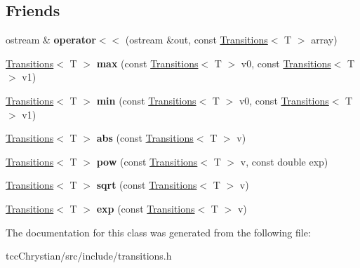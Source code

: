 \subsection*{Friends}
\begin{DoxyCompactItemize}
\item 
\hypertarget{classTransitions_a1f38245bca1673c266b44e9e2107c13d}{ostream \& {\bfseries operator$<$$<$} (ostream \&out, const \hyperlink{classTransitions}{Transitions}$<$ T $>$ array)}\label{classTransitions_a1f38245bca1673c266b44e9e2107c13d}

\item 
\hypertarget{classTransitions_af72b4da733791d7d350ed72162d8ea0f}{\hyperlink{classTransitions}{Transitions}$<$ T $>$ {\bfseries max} (const \hyperlink{classTransitions}{Transitions}$<$ T $>$ v0, const \hyperlink{classTransitions}{Transitions}$<$ T $>$ v1)}\label{classTransitions_af72b4da733791d7d350ed72162d8ea0f}

\item 
\hypertarget{classTransitions_aff6065ed38f85bcd39d2c2f8ce45f1d9}{\hyperlink{classTransitions}{Transitions}$<$ T $>$ {\bfseries min} (const \hyperlink{classTransitions}{Transitions}$<$ T $>$ v0, const \hyperlink{classTransitions}{Transitions}$<$ T $>$ v1)}\label{classTransitions_aff6065ed38f85bcd39d2c2f8ce45f1d9}

\item 
\hypertarget{classTransitions_a3b968e944feed8bcb98aa1e6286fe175}{\hyperlink{classTransitions}{Transitions}$<$ T $>$ {\bfseries abs} (const \hyperlink{classTransitions}{Transitions}$<$ T $>$ v)}\label{classTransitions_a3b968e944feed8bcb98aa1e6286fe175}

\item 
\hypertarget{classTransitions_a34f2a85ed601558365305cdcab645914}{\hyperlink{classTransitions}{Transitions}$<$ T $>$ {\bfseries pow} (const \hyperlink{classTransitions}{Transitions}$<$ T $>$ v, const double exp)}\label{classTransitions_a34f2a85ed601558365305cdcab645914}

\item 
\hypertarget{classTransitions_aba9a3cd675e2077b57456b6ff699660d}{\hyperlink{classTransitions}{Transitions}$<$ T $>$ {\bfseries sqrt} (const \hyperlink{classTransitions}{Transitions}$<$ T $>$ v)}\label{classTransitions_aba9a3cd675e2077b57456b6ff699660d}

\item 
\hypertarget{classTransitions_ac02e6f8b007f44d55ed6b202c18ac0f8}{\hyperlink{classTransitions}{Transitions}$<$ T $>$ {\bfseries exp} (const \hyperlink{classTransitions}{Transitions}$<$ T $>$ v)}\label{classTransitions_ac02e6f8b007f44d55ed6b202c18ac0f8}

\end{DoxyCompactItemize}


The documentation for this class was generated from the following file\-:\begin{DoxyCompactItemize}
\item 
tcc\-Chrystian/src/include/transitions.\-h\end{DoxyCompactItemize}
